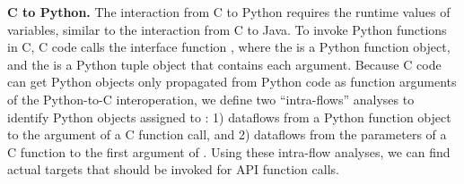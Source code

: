 \textbf{C to Python.} The interaction from C to Python requires the runtime
values of variables, similar to the interaction from C to Java. 
To invoke Python functions in C, C code calls the interface function
, where the  is a Python
function object, and the  is a Python tuple object that contains
each argument. 
Because C code can get Python objects only propagated from Python code as
function arguments of the Python-to-C interoperation, we define two
``intra-flows'' analyses to identify Python objects assigned to :
1) dataflows from a Python function object to the argument of a C function call,
and 2) dataflows from the parameters of a C function to the first argument of . 
Using these intra-flow analyses, we can find actual targets that should be invoked
for  API function calls.


